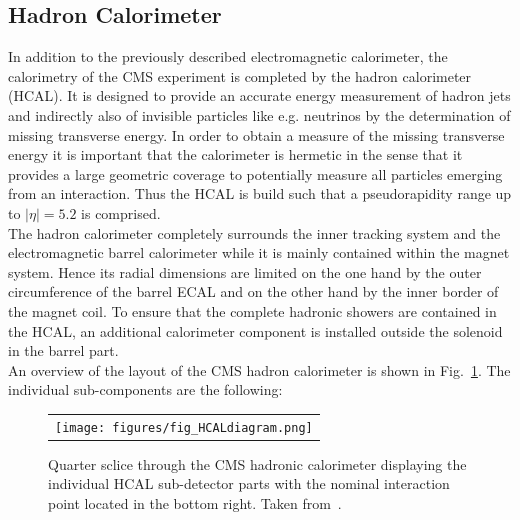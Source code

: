 \subsection{Hadron Calorimeter}
\label{subsec:cms_hcal}
In addition to the previously described electromagnetic calorimeter, the calorimetry of the CMS experiment is completed by the hadron calorimeter (HCAL). It is designed to provide an accurate energy measurement of hadron jets and indirectly also of invisible particles like e.g. neutrinos by the determination of missing transverse energy. In order to obtain a measure of the missing transverse energy it is important that the calorimeter is hermetic in the sense that it provides a large geometric coverage to potentially measure all particles emerging from an interaction. Thus the HCAL is build such that a pseudorapidity range up to $|\eta| = 5.2$ is comprised. \\ 
The hadron calorimeter completely surrounds the inner tracking system and the electromagnetic barrel calorimeter while it is mainly contained within the magnet system. Hence its radial dimensions are limited on the one hand by the outer circumference of the barrel ECAL and on the other hand by the inner border of the magnet coil. To ensure that the complete hadronic showers are contained in the HCAL, an additional calorimeter component is installed outside the solenoid in the barrel part. \\
An overview of the layout of the CMS hadron calorimeter is shown in Fig.~\ref{fig:CMS_hcal}. The individual sub-components are the following:
\begin{figure}[!tp]
  \centering
  \begin{tabular}{c}
    \texttt{[image: figures/fig\_HCALdiagram.png]}
  \end{tabular}
  \caption{Quarter sclice through the CMS hadronic calorimeter displaying the individual HCAL sub-detector parts with the nominal interaction point located in the bottom right. Taken from~\cite{Chatrchyan:2009ag}.}
  \label{fig:CMS_hcal}
\end{figure}
